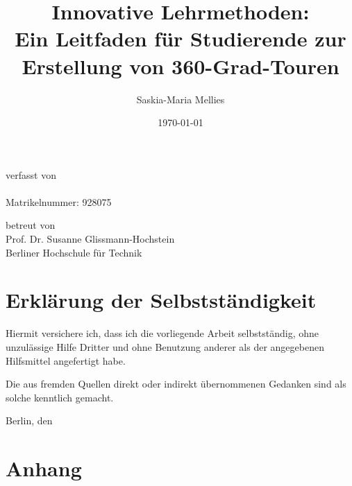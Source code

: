 \documentclass[a4paper, 11pt]{article}
\title{Innovative Lehrmethoden: \\Ein Leitfaden für Studierende zur Erstellung von 360-Grad-Touren}
\author{Saskia-Maria Mellies}
\date{\today}
\begin{document}
\begin{titlepage}
    \begin{center}
        \vspace*{1cm}
        \Huge
        \textbf{\thetitle}
        
        \Large
        verfasst von \\
        \theauthor \\
        Matrikelnummer: 928075
        
        \vfill
        
        betreut von \\
        Prof. Dr. Susanne Glissmann-Hochstein \\
        Berliner Hochschule für Technik \\
    
        
        \vspace{1.5cm}
        
        \Large
        \thedate
        
    \end{center}
\end{titlepage}

\tableofcontents
\newpage

\listoffigures
\listoftables
\newpage

\printnoidxglossary[type=\acronymtype,title=Abkürzungsverzeichnis]
\newpage



\setcounter{page}{1}




\medskip
\newpage

\newpage
\printbibliography[]
\newpage

\section*{Erklärung der Selbstständigkeit}

Hiermit versichere ich, dass ich die vorliegende Arbeit selbstständig, ohne unzulässige Hilfe Dritter und ohne Benutzung anderer als der angegebenen Hilfsmittel angefertigt habe.

Die aus fremden Quellen direkt oder indirekt übernommenen Gedanken sind als solche kenntlich gemacht. 

Berlin, den \thedate

\newpage
\section*{Anhang}
\end{document}
